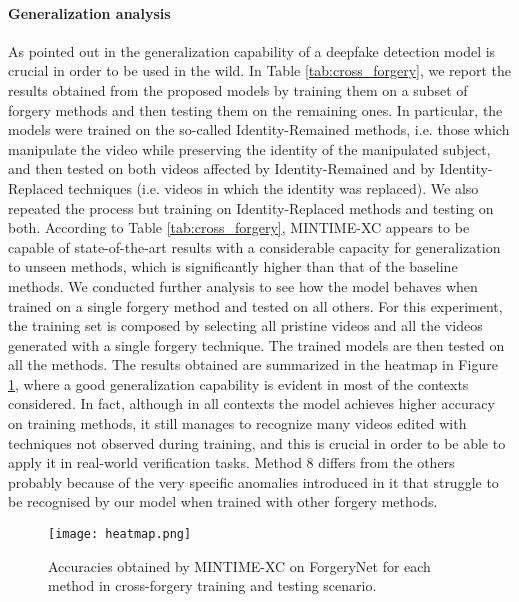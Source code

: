 \documentclass[10pt,twocolumn,letterpaper]{article}
\begin{document}
\paragraph{Generalization analysis}
As pointed out in \cite{10.1145/3512732.3533582} the generalization capability of a deepfake detection model is crucial in order to be used in  the wild. In Table \ref{tab:cross_forgery}, we report the results obtained from the proposed models by training them on a subset of forgery methods and then testing them on the remaining ones. In particular, the models were trained on the so-called Identity-Remained methods, i.e. those which manipulate the video while preserving the identity of the manipulated subject, and then tested on both videos affected by Identity-Remained and by Identity-Replaced techniques (i.e. videos in which the identity was replaced). We also repeated the process but training on Identity-Replaced methods and testing on both. According to Table \ref{tab:cross_forgery}, MINTIME-XC appears to be capable of state-of-the-art results with a considerable capacity for generalization to unseen methods, which is significantly higher than that of the baseline methods. 
We conducted further analysis to see how the model behaves when trained on a single forgery method and tested on all others. For this experiment, the training set is composed by selecting all pristine videos and all the videos generated with a single forgery technique. The trained models are then tested on all the methods. The results obtained are summarized in the heatmap in Figure \ref{fig:heatmap}, where a good generalization capability is evident in most of the contexts considered. In fact, although in all contexts the model achieves higher accuracy on training methods, it still manages to recognize many videos edited with techniques not observed during training, and this is crucial in order to be able to apply it in real-world verification tasks. Method 8 differs from the others probably because of the very specific anomalies introduced in it that struggle to be recognised by our model when trained with other forgery methods.
\begin{figure}[t]
    \centering
    \texttt{[image: heatmap.png]}
    \caption{Accuracies obtained by MINTIME-XC on ForgeryNet for each method in cross-forgery training and testing scenario.}
    \label{fig:heatmap}
\end{figure}
\end{document}
